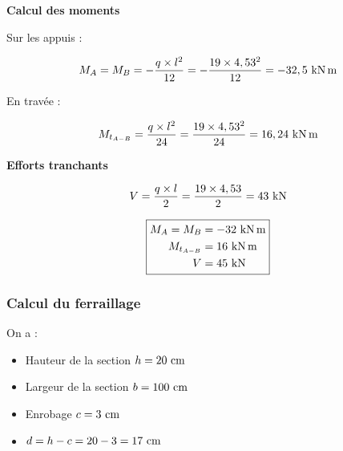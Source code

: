 \begin{figure}[H]
	\centering
\end{figure}



\textbf{Calcul des moments}

Sur les appuis :

\[ M_{A} = M_{B} = -\dfrac{q \times l^{2}}{12} = -\dfrac{19 \times
	4,53^{2}}{12} = -32,5\knxm \]

En travée :

\[ \mmt{A-B} = \dfrac{q \times l^{2}}{24} = \dfrac{19 \times 4,53^{2}}{24} =
16,24\knxm \]

\textbf{Efforts tranchants}

\[ V = \dfrac{q \times l}{2} = \dfrac{19 \times 4,53}{2} = 43\kn \]

\[ \fbox{$\begin{aligned}
		M_{A} = M_{B} &= -32 \knxm \\
		\mmt{A-B} &= 16 \knxm \\
		V &= 45 \kn
	\end{aligned}$} \]


\subsubsection{Calcul du ferraillage}

On a :
\begin{itemize}
	\item Hauteur de la section $h = 20\cml$
	\item Largeur de la section $b = 100\cml$
	\item Enrobage $c = 3\cml $
	\item $d = h - c = 20 - 3 = 17\cml$
\end{itemize}

